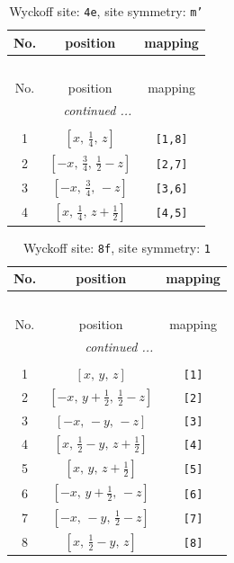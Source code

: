 \documentclass[fleqn,8pt]{jsarticle}
\begin{document}
\renewcommand{\arraystretch}{1.2}
\begin{longtable}{ccc}
\caption{Wyckoff site: {\tt 4e}, site symmetry: {\tt m'}}
 \\
 \hline \hline
No. & position & mapping \\ \hline \endfirsthead

\multicolumn{2}{l}{\tablename\ \thetable{}} \\
 \hline \hline
No. & position & mapping \\ \hline \endhead

 \hline \hline
\multicolumn{2}{r}{\footnotesize\it continued ...} \\ \endfoot

 \hline \hline
\multicolumn{2}{r}{} \\ \endlastfoot

1 & $\left[ x,\, \frac{1}{4},\, z \right]$ & {\tt [1,8]} \\ \hline
2 & $\left[ - x,\, \frac{3}{4},\, \frac{1}{2} - z \right]$ & {\tt [2,7]} \\ \hline
3 & $\left[ - x,\, \frac{3}{4},\, - z \right]$ & {\tt [3,6]} \\ \hline
4 & $\left[ x,\, \frac{1}{4},\, z + \frac{1}{2} \right]$ & {\tt [4,5]} \\
\end{longtable}
\renewcommand{\arraystretch}{1.2}
\begin{longtable}{ccc}
\caption{Wyckoff site: {\tt 8f}, site symmetry: {\tt 1}}
 \\
 \hline \hline
No. & position & mapping \\ \hline \endfirsthead

\multicolumn{2}{l}{\tablename\ \thetable{}} \\
 \hline \hline
No. & position & mapping \\ \hline \endhead

 \hline \hline
\multicolumn{2}{r}{\footnotesize\it continued ...} \\ \endfoot

 \hline \hline
\multicolumn{2}{r}{} \\ \endlastfoot

1 & $\left[ x,\, y,\, z \right]$ & {\tt [1]} \\ \hline
2 & $\left[ - x,\, y + \frac{1}{2},\, \frac{1}{2} - z \right]$ & {\tt [2]} \\ \hline
3 & $\left[ - x,\, - y,\, - z \right]$ & {\tt [3]} \\ \hline
4 & $\left[ x,\, \frac{1}{2} - y,\, z + \frac{1}{2} \right]$ & {\tt [4]} \\ \hline
5 & $\left[ x,\, y,\, z + \frac{1}{2} \right]$ & {\tt [5]} \\ \hline
6 & $\left[ - x,\, y + \frac{1}{2},\, - z \right]$ & {\tt [6]} \\ \hline
7 & $\left[ - x,\, - y,\, \frac{1}{2} - z \right]$ & {\tt [7]} \\ \hline
8 & $\left[ x,\, \frac{1}{2} - y,\, z \right]$ & {\tt [8]} \\
\end{longtable}
\end{document}
